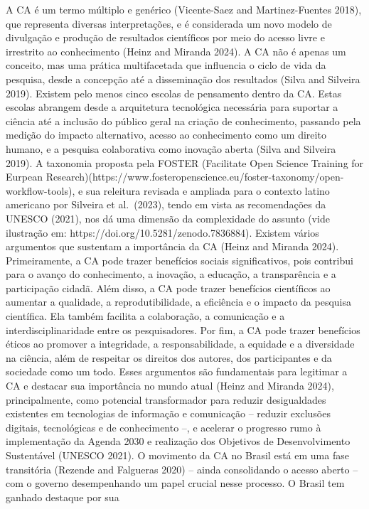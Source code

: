 \documentclass[
  a4paper,
]{article}
\begin{document}
A CA é um termo múltiplo e genérico (Vicente-Saez and Martinez-Fuentes
2018), que representa diversas interpretações, e é considerada um novo
modelo de divulgação e produção de resultados científicos por meio do
acesso livre e irrestrito ao conhecimento (Heinz and Miranda 2024). A CA
não é apenas um conceito, mas uma prática multifacetada que influencia o
ciclo de vida da pesquisa, desde a concepção até a disseminação dos
resultados (Silva and Silveira 2019). Existem pelo menos cinco escolas
de pensamento dentro da CA. Estas escolas abrangem desde a arquitetura
tecnológica necessária para suportar a ciência até a inclusão do público
geral na criação de conhecimento, passando pela medição do impacto
alternativo, acesso ao conhecimento como um direito humano, e a pesquisa
colaborativa como inovação aberta (Silva and Silveira 2019). A taxonomia
proposta pela FOSTER (Facilitate Open Science Training for Eurpean
Research)(https://www.fosteropenscience.eu/foster-taxonomy/open-workflow-tools),
e sua releitura revisada e ampliada para o contexto latino americano por
Silveira et al.~(2023), tendo em vista as recomendações da UNESCO
(2021), nos dá uma dimensão da complexidade do assunto (vide ilustração
em: https://doi.org/10.5281/zenodo.7836884). Existem vários argumentos
que sustentam a importância da CA (Heinz and Miranda 2024).
Primeiramente, a CA pode trazer benefícios sociais significativos, pois
contribui para o avanço do conhecimento, a inovação, a educação, a
transparência e a participação cidadã. Além disso, a CA pode trazer
benefícios científicos ao aumentar a qualidade, a reprodutibilidade, a
eficiência e o impacto da pesquisa científica. Ela também facilita a
colaboração, a comunicação e a interdisciplinaridade entre os
pesquisadores. Por fim, a CA pode trazer benefícios éticos ao promover a
integridade, a responsabilidade, a equidade e a diversidade na ciência,
além de respeitar os direitos dos autores, dos participantes e da
sociedade como um todo. Esses argumentos são fundamentais para legitimar
a CA e destacar sua importância no mundo atual (Heinz and Miranda 2024),
principalmente, como potencial transformador para reduzir desigualdades
existentes em tecnologias de informação e comunicação -- reduzir
exclusões digitais, tecnológicas e de conhecimento --, e acelerar o
progresso rumo à implementação da Agenda 2030 e realização dos Objetivos
de Desenvolvimento Sustentável (UNESCO 2021). O movimento da CA no
Brasil está em uma fase transitória (Rezende and Falgueras 2020) --
ainda consolidando o acesso aberto -- com o governo desempenhando um
papel crucial nesse processo. O Brasil tem ganhado destaque por sua
\end{document}
